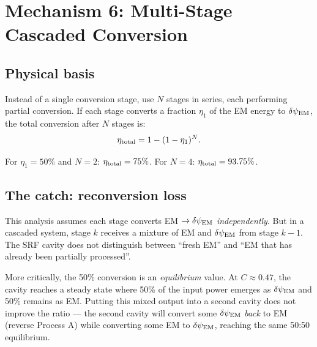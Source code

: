 \documentclass[11pt]{article}
\newcommand{\dpsiEM}{\delta\psi_{\rm EM}}
\begin{document}
\section{Mechanism 6: Multi-Stage Cascaded Conversion}
\label{sec:mech-cascade}

\subsection{Physical basis}

Instead of a single conversion stage, use $N$ stages in series, each
performing partial conversion. If each stage converts a fraction
$\eta_1$ of the EM energy to $\dpsiEM$, the total conversion after
$N$ stages is:
\begin{equation}
\eta_{\rm total} = 1 - (1 - \eta_1)^N.
\end{equation}

For $\eta_1 = 50\%$ and $N = 2$: $\eta_{\rm total} = 75\%$.
For $N = 4$: $\eta_{\rm total} = 93.75\%$.

\subsection{The catch: reconversion loss}

This analysis assumes each stage converts EM $\to \dpsiEM$
\emph{independently}. But in a cascaded system, stage $k$ receives a
mixture of EM and $\dpsiEM$ from stage $k-1$. The SRF cavity does
not distinguish between ``fresh EM'' and ``EM that has already been
partially processed''.

More critically, the 50\% conversion is an \emph{equilibrium} value.
At $C \approx 0.47$, the cavity reaches a steady state where 50\% of
the input power emerges as $\dpsiEM$ and 50\% remains as EM. Putting
this mixed output into a second cavity does not improve the ratio ---
the second cavity will convert some $\dpsiEM$ \emph{back} to EM
(reverse Process A) while converting some EM to $\dpsiEM$, reaching
the same 50:50 equilibrium.
\end{document}
